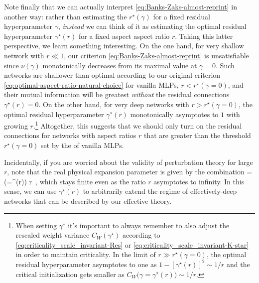 Note finally that we can actually interpret \eqref{eq:Banks-Zaks-almost-reprint} in another way: rather than estimating the  $r^\star(\gamma)$ for a fixed residual hyperparameter $\gamma$, \emph{instead} we can think of it as estimating the optimal residual hyperparameter $\gamma^\star(r)$ for a fixed aspect aspect ratio $r$. 
Taking this latter perspective, we learn something interesting. On the one hand, for very shallow network with $r \ll 1$,  our criterion \eqref{eq:Banks-Zaks-almost-reprint} is unsatisfiable since $\nu(\gamma)$ monotonically decreases from its maximal value at $\gamma=0$.  Such networks are shallower than optimal according to our original criterion \eqref{eq:optimal-aspect-ratio-natural-choice} for vanilla MLPs, $r <r^\star(\gamma=0)$, and their mutual information will be greatest \emph{without}  the residual connections $\gamma^\star(r)=0$.
On the other hand, for very deep networks with $r >r^\star(\gamma=0)$, the optimal residual hyperparameter $\gamma^\star(r)$ monotonically asymptotes to $1$ with growing $r$.\footnote{
    When setting $\gamma^\star$ it's important to always remember to also adjust the rescaled weight variance $C_W(\gamma^\star)$  according to \eqref{eq:criticality_scale_invariant-Res} or \eqref{eq:criticality_scale_invariant-K-star} in order to maintain criticality.
In the limit of $r \gg r^\star(\gamma=0)$, the optimal residual hyperparameter asymptotes to one as $1-[\gamma^\star(r)]^2\sim 1/r$ and the critical initialization gets smaller as $C_W\big(\gamma=\gamma^\star(r)\big)\sim 1/r$.
} 
Altogether, this suggests that we should only turn on the residual connections for networks with aspect ratios $r$ that are greater than the threshold $r^\star(\gamma=0)$ set by the  of vanilla MLPs.

Incidentally, if you are worried about the validity of perturbation theory for large $r$, note that the real physical expansion parameter is given by the combination 
\be
{}= \nu\Big(\gamma=\gamma^\star(r)\Big) \times r \,, 
\ee
which stays finite even as the ratio $r$ asymptotes to infinity. In this sense, we can use $\gamma^\star(r)$ to arbitrarily extend the regime of effectively-deep networks that can be described by our effective theory.









































